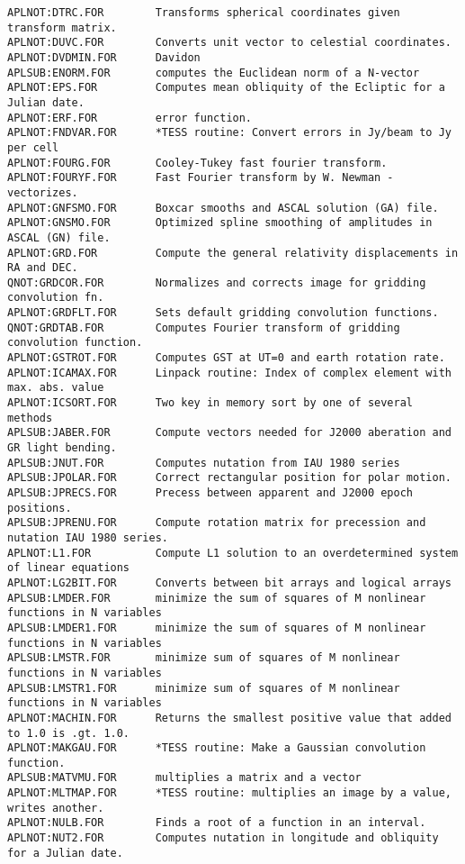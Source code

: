 \begin{verbatim}
APLNOT:DTRC.FOR        Transforms spherical coordinates given transform matrix.
APLNOT:DUVC.FOR        Converts unit vector to celestial coordinates.
APLNOT:DVDMIN.FOR      Davidon
APLSUB:ENORM.FOR       computes the Euclidean norm of a N-vector
APLNOT:EPS.FOR         Computes mean obliquity of the Ecliptic for a Julian date.
APLNOT:ERF.FOR         error function.
APLNOT:FNDVAR.FOR      *TESS routine: Convert errors in Jy/beam to Jy per cell
APLNOT:FOURG.FOR       Cooley-Tukey fast fourier transform.
APLNOT:FOURYF.FOR      Fast Fourier transform by W. Newman - vectorizes.
APLNOT:GNFSMO.FOR      Boxcar smooths and ASCAL solution (GA) file.
APLNOT:GNSMO.FOR       Optimized spline smoothing of amplitudes in ASCAL (GN) file.
APLNOT:GRD.FOR         Compute the general relativity displacements in RA and DEC.
QNOT:GRDCOR.FOR        Normalizes and corrects image for gridding convolution fn.
APLNOT:GRDFLT.FOR      Sets default gridding convolution functions.
QNOT:GRDTAB.FOR        Computes Fourier transform of gridding convolution function.
APLNOT:GSTROT.FOR      Computes GST at UT=0 and earth rotation rate.
APLNOT:ICAMAX.FOR      Linpack routine: Index of complex element with max. abs. value
APLNOT:ICSORT.FOR      Two key in memory sort by one of several methods
APLSUB:JABER.FOR       Compute vectors needed for J2000 aberation and GR light bending.
APLSUB:JNUT.FOR        Computes nutation from IAU 1980 series
APLSUB:JPOLAR.FOR      Correct rectangular position for polar motion.
APLSUB:JPRECS.FOR      Precess between apparent and J2000 epoch positions.
APLSUB:JPRENU.FOR      Compute rotation matrix for precession and nutation IAU 1980 series.
APLNOT:L1.FOR          Compute L1 solution to an overdetermined system of linear equations
APLNOT:LG2BIT.FOR      Converts between bit arrays and logical arrays
APLSUB:LMDER.FOR       minimize the sum of squares of M nonlinear functions in N variables
APLSUB:LMDER1.FOR      minimize the sum of squares of M nonlinear functions in N variables
APLSUB:LMSTR.FOR       minimize sum of squares of M nonlinear functions in N variables
APLSUB:LMSTR1.FOR      minimize sum of squares of M nonlinear functions in N variables
APLNOT:MACHIN.FOR      Returns the smallest positive value that added to 1.0 is .gt. 1.0.
APLNOT:MAKGAU.FOR      *TESS routine: Make a Gaussian convolution function.
APLSUB:MATVMU.FOR      multiplies a matrix and a vector
APLNOT:MLTMAP.FOR      *TESS routine: multiplies an image by a value, writes another.
APLNOT:NULB.FOR        Finds a root of a function in an interval.
APLNOT:NUT2.FOR        Computes nutation in longitude and obliquity for a Julian date.

\end{verbatim}
